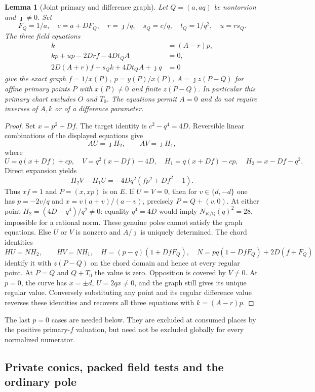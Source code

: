 \documentclass[11pt]{article}
\newtheorem{lemma}[theorem]{Lemma}
\theoremstyle{definition}
\theoremstyle{remark}
\newcommand{\Q}{\mathbb Q}
\begin{document}
\begin{lemma}[Joint primary and difference graph]
\label{lem:quartic-joint-chart}
Let $Q=(a,aq)$ be nontorsion and $\jmath\ne0$. Set
\[
 F_Q=1/a,\quad c=a+DF_Q,\quad
 r=\jmath/q,\quad s_Q=c/q,\quad t_Q=1/q^2,\quad u=rs_Q.
\]
The three field equations
\begin{align}
 k&=(A-r)p,\\
 kp+up-2Drf-4Dt_QA&=0,\\
 2D(A+r)f+s_Qk+4Dt_QA+\jmath q&=0
\end{align}
give the exact graph $f=1/x(P)$, $p=y(P)/x(P)$,
$A=\jmath z(P-Q)$ for affine primary points $P$ with $x(P)\ne0$
and finite $z(P-Q)$. In particular this primary chart excludes $O$ and
$T_0$. The equations permit $A=0$ and do not
require inverses of $A,k$ or of a difference parameter.
\end{lemma}
\begin{proof}
Set $x=p^2+Df$. The target identity is $c^2-q^4=4D$.
Reversible linear combinations of the displayed equations give
\[
 A U=\jmath H_2,\qquad A V=\jmath H_1,
\]
where
\[
 U=q(x+Df)+cp,\quad V=q^2(x-Df)-4D,\quad
 H_1=q(x+Df)-cp,\quad H_2=x-Df-q^2.
\]
Direct expansion yields
\[
 H_2V-H_1U=-4Dq^2(fp^2+Df^2-1).
\]
Thus $xf=1$ and $P=(x,xp)$ is on $E$. If $U=V=0$, then for
$v\in\{d,-d\}$ one has
$p=-2v/q$ and $x=v(a+v)/(a-v)$, precisely $P=Q+(v,0)$.
At either point $H_2=(4D-q^4)/q^2\ne0$: equality $q^4=4D$ would imply
$N_{K/\Q}(q)^2=28$, impossible for a rational norm. These genuine poles
cannot satisfy the graph equations. Else $U$ or $V$ is nonzero and
$A/\jmath$ is uniquely determined. The chord identities
\[
 H U=N H_2,\qquad H V=N H_1,
\quad H=(p-q)(1+DfF_Q),\quad
 N=pq(1-DfF_Q)+2D(f+F_Q)
\]
identify it with $z(P-Q)$ on the chord domain and hence at every regular
point. At $P=Q$ and $Q+T_0$ the value is zero. Opposition is covered by
$V\ne0$. At $p=0$, the curve has $x=\pm d$, $U=2qx\ne0$, and the graph
still gives its unique regular value. Conversely substituting any point
and its regular difference value reverses these identities and recovers
all three equations with $k=(A-r)p$.
\end{proof}

The last $p=0$ cases are needed below. They are excluded at consumed places
by the positive primary-$f$ valuation, but need not be excluded globally
for every normalized numerator.

\subsection{Private conics, packed field tests and the ordinary pole}
\end{document}
